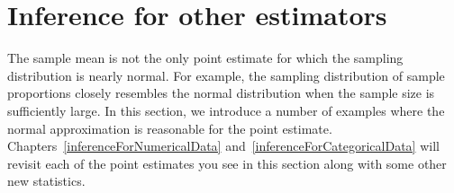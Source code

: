 %
%
%


\section{Inference for other estimators}
\label{aFrameworkForInference}

The sample mean is not the only point estimate for which the sampling distribution is nearly normal. For example, the sampling distribution of sample proportions closely resembles the normal distribution when the sample size is sufficiently large. In this section, we introduce a number of examples where the normal approximation is reasonable for the point estimate. Chapters~\ref{inferenceForNumericalData} and~\ref{inferenceForCategoricalData} will revisit each of the point estimates you see in this section along with some other new statistics.

